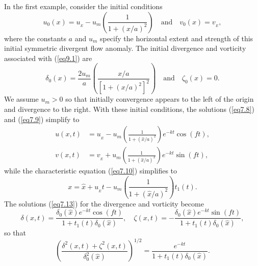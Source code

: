 \documentclass[10pt]{article}
\begin{document}
     In the first example, consider the initial conditions
\begin{equation}                                  %
       u_0(x) = u_{_E} - u_m \left(\frac{1}{1 + (x/a)^2}\right)
                \quad \text{and} \quad v_0(x) = v_{_E},
\label{eq9.1}
\end{equation}
where the constants $a$ and $u_m$ specify the horizontal extent and strength
of this initial symmetric divergent flow anomaly. The initial divergence and
vorticity associated with (\ref{eq9.1}) are
\begin{equation}                                  %
     \delta_0(x) = \frac{2u_m}{a} \left(\frac{x/a}{[1 + (x/a)^2]^2}\right)
          \quad \text{and} \quad  \zeta_0(x)  = 0.
\label{eq9.2}
\end{equation}
We assume $u_m>0$ so that initially convergence appears to the left
of the origin and divergence to the right. With these initial conditions,
the solutions (\ref{eq7.8}) and (\ref{eq7.9}) simplify to
\begin{equation}                                  %
  \begin{split}
       u(x,t) &= u_{_E} - u_m\left(\frac{1}{1 + (\hat{x}/a)^2}\right)e^{-kt}\cos(ft), \\
       v(x,t) &= v_{_E} + u_m\left(\frac{1}{1 + (\hat{x}/a)^2}\right)e^{-kt}\sin(ft),
  \end{split}
\label{eq9.3}
\end{equation}
while the characteristic equation (\ref{eq7.10}) simplifies to
\begin{equation}                                  %
       x = \hat{x} + u_{_E}t - u_m\left(\frac{1}{1 + (\hat{x}/a)^2}\right)t_1(t).
\label{eq9.4}
\end{equation}
The solutions (\ref{eq7.13}) for the divergence and vorticity become
\begin{equation}                                  %
       \delta(x,t) = \frac{\delta_0(\hat{x})e^{-kt}\cos(ft)}{1 + t_1(t)\delta_0(\hat{x})},   \quad
       \zeta (x,t) =-\frac{\delta_0(\hat{x})e^{-kt}\sin(ft)}{1 + t_1(t)\delta_0(\hat{x})},
\label{eq9.5}
\end{equation}
so that
\begin{equation}                                    %
        \left(\frac{\delta^2(x,t) + \zeta^2(x,t)}{\delta_0^2(\hat{x})}\right)^{1/2}
     = \frac{e^{-kt}}{1 + t_1(t)\delta_0(\hat{x})}.
\label{eq9.6}
\end{equation}
\end{document}
